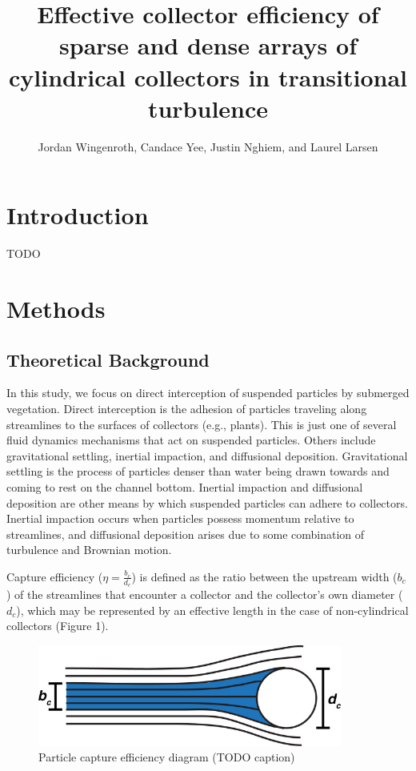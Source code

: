 \documentclass[10pt,a4paper]{article}
\author{Jordan Wingenroth, Candace Yee, Justin Nghiem, and Laurel Larsen}
\title{Effective collector efficiency of sparse and dense arrays of cylindrical collectors in transitional turbulence}
\begin{document}
\maketitle

\section{Introduction}

TODO

\section{Methods}

\subsection{Theoretical Background}

In this study, we focus on direct interception of suspended particles by submerged vegetation. Direct interception is the adhesion of particles traveling along streamlines to the surfaces of collectors (e.g., plants). This is just one of several fluid dynamics mechanisms that act on suspended particles. Others include gravitational settling, inertial impaction, and diffusional deposition. Gravitational settling is the process of particles denser than water being drawn towards and coming to rest on the channel bottom. Inertial impaction and diffusional deposition are other means by which suspended particles can adhere to collectors. Inertial impaction occurs when particles possess momentum relative to streamlines, and diffusional deposition arises due to some combination of turbulence and Brownian motion.

Capture efficiency ($\eta=\frac{b_c}{d_c}$) is defined as the ratio between the upstream width ($b_c$) of the streamlines that encounter a collector and the collector's own diameter ($d_c$), which may be represented by an effective length in the case of non-cylindrical collectors (Figure 1). 


\begin{figure}[h]
\includegraphics[width=10cm]{fauria particle capture efficiency diagram.jpg}
\centering
\caption{Particle capture efficiency diagram (TODO caption)}
\end{figure}
\end{document}
